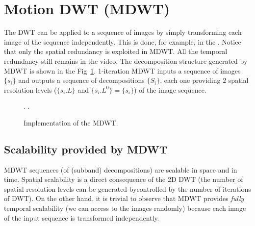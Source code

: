 
\section{Motion DWT (MDWT)}
The DWT can be applied to a sequence of images by simply transforming
each image of the sequence independently. This is done, for example,
in the . Notice that only the spatial redundancy is exploited in
MDWT. All the temporal redundancy still remains in the video. The
decomposition structure generated by MDWT is shown in the
Fig~\ref{fig:forward_MDWT}. 1-iteration MDWT inputs a sequence of
images $\{s_i\}$ and outputs a sequence of decompositions $\{S_i\}$,
each one providing 2 spatial resolution levels ($\{s_i.L\}$ and
$\{s_i.L^0\}=\{s_i\}$) of the image sequence.

\begin{figure}
  \centering {}
  .
  .
  \caption{Implementation of the MDWT.} %
  \label{fig:forward_MDWT}
\end{figure}

\subsection{Scalability provided by MDWT}
MDWT sequences (of (subband) decompositions) are scalable in space and
in time. Spatial scalability is a direct consequence of the 2D DWT
(the number of spatial resolution levels can be generated bycontrolled by the number
of iterations of DWT). On the other hand, it is trivial to observe
that MDWT provides \emph{fully} temporal scalability (we can access to
the images randomly) because each image of the input sequence is
transformed independently.

